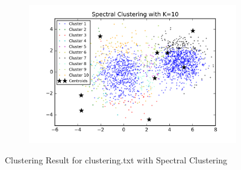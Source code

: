 \begin{figure}[htb]
\begin{subfigure}[b]{0.475\textwidth}
            \includegraphics[width=\textwidth]{./figures/clustering_spectral_10.png}
        \end{subfigure}
        
        \caption{Clustering Result for clustering.txt with Spectral Clustering}
        \label{fig:kmean_clustering}
\end{figure}

